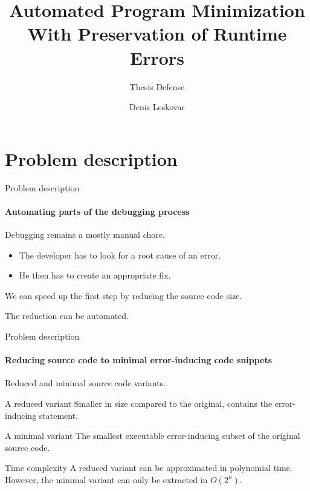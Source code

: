\documentclass{beamer}
\title{Automated Program Minimization \protect\\ With Preservation of Runtime Errors} %
\subtitle{Thesis Defense} %
\author{Denis Leskovar}
\begin{document}
  \shorthandoff{-}
  \frame[c]{\maketitle}

\section{Problem description}

    \begin{frame}{Problem description}
      \framesubtitle{Automating parts of the debugging process}
      Debugging remains a mostly manual chore.\\
      \begin{itemize}
          \item The developer has to look for a root cause of an error.\\
          \item He then has to create an appropriate fix.\\
      \end{itemize}
      
      \bigskip

      We can speed up the first step by reducing the source code size.\\
      
      \bigskip
      \bigskip
      
      The \alert{reduction} can be \alert{automated}.
    \end{frame}

    \begin{frame}{Problem description}
      \framesubtitle{Reducing source code to \alert{minimal} error-inducing code snippets}
      Reduced and minimal source code variants.

      \begin{block}{A reduced variant}
        Smaller in size compared to the original, contains the error-inducing statement.
      \end{block}
      \begin{block}{A minimal variant}
        The \alert{smallest} executable error-inducing \alert{subset} of the original source code.
      \end{block}
      \begin{alertblock}{Time complexity}
        A reduced variant can be approximated in polynomial time. However, the minimal variant can only be extracted in $O(2^n)$.
      \end{alertblock}
    \end{frame}
\end{document}
